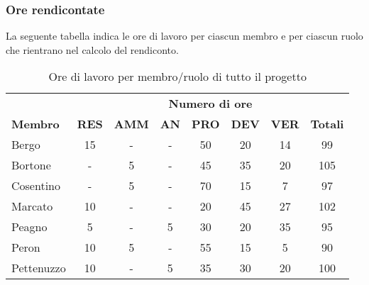 	\subsubsection{Ore rendicontate}
		La seguente tabella indica le ore di lavoro per ciascun membro e per ciascun ruolo che rientrano nel calcolo del rendiconto.
		\begin{table}[h]
		\centering
		\begin{tabular}{| l | c c c c c c | c |}
			\rowcolor{LightBlue}
			& \multicolumn{7}{c}{\textbf{\color{white}Numero di ore}}	\\
	
			\rowcolor{LightBlue}
			\textbf{\color{white}Membro}
			& \textbf{\color{white}RES}
			& \textbf{\color{white}AMM}
			& \textbf{\color{white}AN}
			& \textbf{\color{white}PRO}
			& \textbf{\color{white}DEV}
			& \textbf{\color{white}VER}
			& \textbf{\color{white}Totali}\\
	
			Bergo 				& 15 & - & - & 50 & 20 & 14 & 99 \\
			Bortone 			& -  & 5 & - & 45 & 35 & 20 & 105\\
			Cosentino 		& -  & 5 & - & 70 & 15 & 7  & 97 \\
			Marcato 			& 10 & - & - & 20 & 45 & 27 & 102\\
			Peagno 			& 5  & - & 5 & 30 & 20 & 35 & 95 \\
			Peron 				& 10 & 5 & - & 55 & 15 & 5  & 90 \\
			Pettenuzzo 	& 10 & - & 5 & 35 & 30 & 20 & 100\\ \hline
		\end{tabular}
		\caption{Ore di lavoro per membro/ruolo di tutto il progetto}
		\end{table}
	
